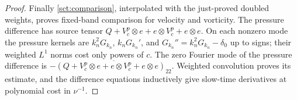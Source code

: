 \begin{proof}
Finally \eqref{sct:comparison}, interpolated with the just-proved
doubled weights, proves fixed-band comparison for velocity and
vorticity. The pressure difference has source tensor
$Q+V_c^p\otimes e+e\otimes V_c^p+e\otimes e$.
On each nonzero mode the pressure kernels are $k_n^2G_{k_n}$,
$k_nG_{k_n}'$, and $G_{k_n}''=k_n^2G_{k_n}-\delta_0$ up to signs;
their weighted $L^1$ norms cost only powers of $c$. The zero Fourier mode of the pressure difference is
$-\overline{(Q+V_c^p\otimes e+e\otimes V_c^p+e\otimes e)_{22}}$. Weighted convolution proves its
estimate, and the difference equations inductively give slow-time
derivatives at polynomial cost in $\nu^{-1}$.
\end{proof}

